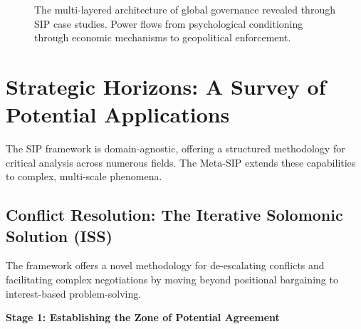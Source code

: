 \documentclass[11pt,a4paper]{article}
\begin{document}
\begin{figure}[ht]
\centering
{}
\caption{The multi-layered architecture of global governance revealed through SIP case studies. Power flows from psychological conditioning through economic mechanisms to geopolitical enforcement.}
\label{fig:governance_pyramid}
\end{figure}

\section{Strategic Horizons: A Survey of Potential Applications}

The SIP framework is domain-agnostic, offering a structured methodology for critical analysis across numerous fields. The Meta-SIP extends these capabilities to complex, multi-scale phenomena.

\subsection{Conflict Resolution: The Iterative Solomonic Solution (ISS)}

The framework offers a novel methodology for de-escalating conflicts and facilitating complex negotiations by moving beyond positional bargaining to interest-based problem-solving.

\textbf{Stage 1: Establishing the Zone of Potential Agreement}
\end{document}
